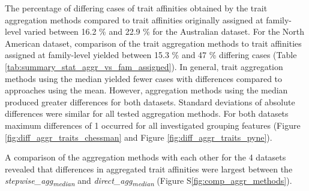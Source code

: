 \documentclass{article}
\begin{document}
The percentage of differing cases of trait affinities obtained by the trait aggregation methods compared to trait affinities originally assigned at family-level varied between 16.2 \% and 22.9 \% for the Australian dataset. For the North American dataset, comparison of the trait aggregation methods to trait affinities assigned at family-level yielded between 15.3 \% and 47 \% differing cases (Table \ref{tab:summary_stat_aggr_vs_fam_assigned}). In general, trait aggregation methods using the median yielded fewer cases with differences compared to approaches using the mean. However, aggregation methods using the median produced greater differences for both datasets. Standard deviations of absolute differences were similar for all tested aggregation methods. For both datasets maximum differences of 1 occurred for all investigated grouping features (Figure \ref{fig:diff_aggr_traits_chessman} and Figure \ref{fig:diff_aggr_traits_pyne}).

A comparison of the aggregation methods with each other for the 4 datasets revealed that differences in aggregated trait affinities were largest between the \textit{stepwise\_agg\textsubscript{median}} and \textit{direct\_agg\textsubscript{median}} (Figure S\ref{fig:comp_aggr_methods}).
\end{document}
